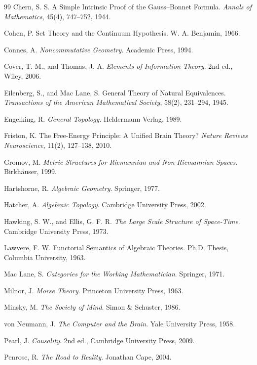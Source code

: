 \documentclass[12pt,oneside]{article}
\theoremstyle{definition}
\begin{document}
\begin{thebibliography}{99}
Chern, S. S.
A Simple Intrinsic Proof of the Gauss--Bonnet Formula.
\textit{Annals of Mathematics},
45(4), 747--752, 1944.

Cohen, P.
Set Theory and the Continuum Hypothesis.
W. A. Benjamin, 1966.

Connes, A.
\textit{Noncommutative Geometry}.
Academic Press, 1994.

Cover, T. M., and Thomas, J. A.
\textit{Elements of Information Theory}.
2nd ed., Wiley, 2006.

Eilenberg, S., and Mac Lane, S.
General Theory of Natural Equivalences.
\textit{Transactions of the American Mathematical Society},
58(2), 231--294, 1945.

Engelking, R.
\textit{General Topology}.
Heldermann Verlag, 1989.

Friston, K.
The Free-Energy Principle: A Unified Brain Theory?
\textit{Nature Reviews Neuroscience},
11(2), 127--138, 2010.

Gromov, M.
\textit{Metric Structures for Riemannian and Non-Riemannian Spaces}.
Birkhäuser, 1999.

Hartshorne, R.
\textit{Algebraic Geometry}.
Springer, 1977.

Hatcher, A.
\textit{Algebraic Topology}.
Cambridge University Press, 2002.

Hawking, S. W., and Ellis, G. F. R.
\textit{The Large Scale Structure of Space-Time}.
Cambridge University Press, 1973.

Lawvere, F. W.
Functorial Semantics of Algebraic Theories.
Ph.D. Thesis,
Columbia University, 1963.

Mac Lane, S.
\textit{Categories for the Working Mathematician}.
Springer, 1971.

Milnor, J.
\textit{Morse Theory}.
Princeton University Press, 1963.

Minsky, M.
\textit{The Society of Mind}.
Simon \& Schuster, 1986.

von Neumann, J.
\textit{The Computer and the Brain}.
Yale University Press, 1958.

Pearl, J.
\textit{Causality}.
2nd ed., Cambridge University Press, 2009.

Penrose, R.
\textit{The Road to Reality}.
Jonathan Cape, 2004.


\end{thebibliography}
\end{document}
